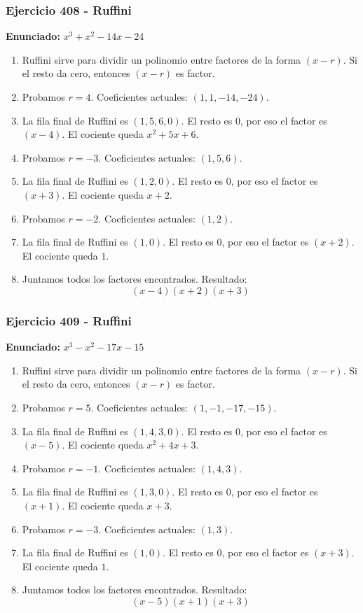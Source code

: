 \documentclass[11pt,a4paper]{article}
\begin{document}
\vspace{0.2cm}
\subsubsection*{Ejercicio 408 - Ruffini}
\textbf{Enunciado:} $ x^{3} + x^{2} - 14 x - 24 $\par
\begin{enumerate}[leftmargin=2em]
\item Ruffini sirve para dividir un polinomio entre factores de la forma \((x-r)\). Si el resto da cero, entonces \((x-r)\) es factor.
\item Probamos \(r=4\). Coeficientes actuales: \((1, 1, -14, -24)\).
\item La fila final de Ruffini es \((1, 5, 6, 0)\). El resto es \(0\), por eso el factor es \((x-4)\). El cociente queda \(x^{2} + 5 x + 6\).
\item Probamos \(r=-3\). Coeficientes actuales: \((1, 5, 6)\).
\item La fila final de Ruffini es \((1, 2, 0)\). El resto es \(0\), por eso el factor es \((x+3)\). El cociente queda \(x + 2\).
\item Probamos \(r=-2\). Coeficientes actuales: \((1, 2)\).
\item La fila final de Ruffini es \((1, 0)\). El resto es \(0\), por eso el factor es \((x+2)\). El cociente queda \(1\).
\item Juntamos todos los factores encontrados. Resultado: \[\boxed{\left(x - 4\right) \left(x + 2\right) \left(x + 3\right)}\]
\end{enumerate}

\vspace{0.2cm}
\subsubsection*{Ejercicio 409 - Ruffini}
\textbf{Enunciado:} $ x^{3} - x^{2} - 17 x - 15 $\par
\begin{enumerate}[leftmargin=2em]
\item Ruffini sirve para dividir un polinomio entre factores de la forma \((x-r)\). Si el resto da cero, entonces \((x-r)\) es factor.
\item Probamos \(r=5\). Coeficientes actuales: \((1, -1, -17, -15)\).
\item La fila final de Ruffini es \((1, 4, 3, 0)\). El resto es \(0\), por eso el factor es \((x-5)\). El cociente queda \(x^{2} + 4 x + 3\).
\item Probamos \(r=-1\). Coeficientes actuales: \((1, 4, 3)\).
\item La fila final de Ruffini es \((1, 3, 0)\). El resto es \(0\), por eso el factor es \((x+1)\). El cociente queda \(x + 3\).
\item Probamos \(r=-3\). Coeficientes actuales: \((1, 3)\).
\item La fila final de Ruffini es \((1, 0)\). El resto es \(0\), por eso el factor es \((x+3)\). El cociente queda \(1\).
\item Juntamos todos los factores encontrados. Resultado: \[\boxed{\left(x - 5\right) \left(x + 1\right) \left(x + 3\right)}\]
\end{enumerate}
\end{document}
